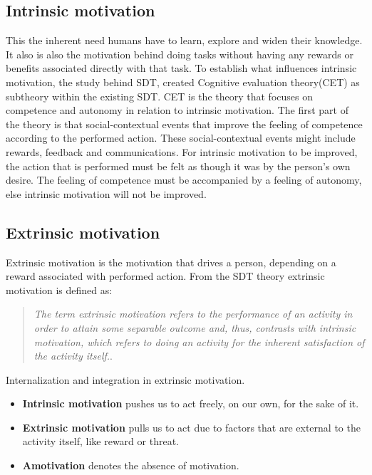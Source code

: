 \subsection*{Intrinsic motivation} 
	This the inherent need humans have to learn, explore and widen their knowledge\cite{SDT}. It also is also the motivation behind doing tasks without having any rewards or benefits associated directly with that task\cite{SDT}. To establish what influences intrinsic motivation, the study behind SDT\cite{SDT}, created Cognitive evaluation theory(CET) as subtheory within the existing SDT. CET is the theory that focuses on competence and autonomy in relation to intrinsic motivation. The first part of the theory is that social-contextual events that improve the feeling of competence according to the performed action\cite[p.~70]{SDT}. These social-contextual events might include rewards, feedback and communications\cite[p.~70]{SDT}. For intrinsic motivation to be improved, the action that is performed must be felt as though it was by the person's own desire. The feeling of competence must be accompanied by a feeling of autonomy, else intrinsic motivation will not be improved\cite[p.~70]{SDT}.\\

\subsection*{Extrinsic motivation}
	Extrinsic motivation is the motivation that drives a person, depending on a reward associated with performed action. From the SDT theory extrinsic motivation is defined as: 
	\begin{quote}
		\textit{The term extrinsic motivation refers to the performance of an activity in order to attain some separable outcome and, thus, contrasts with intrinsic motivation, which refers to doing an activity for the inherent satisfaction of the activity itself.}\cite[p.~71]{SDT}.\\
	\end{quote}
	Internalization and integration in extrinsic motivation.

\begin{itemize}
	\item[ ] \textbf{Intrinsic motivation} pushes us to act freely, on our own, for the sake of it.\\
	\item[ ] \textbf{Extrinsic motivation} pulls us to act due to factors that are external to the activity itself, like reward or threat.\\
	\item[] \textbf{Amotivation} denotes the absence of motivation.\\
\end{itemize}


